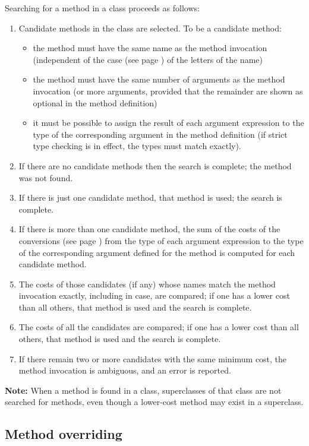 Searching for a method in a class proceeds as follows:
\begin{enumerate}
\item 
Candidate methods in the class are selected.
To be a candidate method:
\begin{itemize}
\item 
the method must have the same name as the method invocation (independent
of the  case (see page \pageref{refcase})  of the letters of the name)
\item 
the method must have the same number of arguments as the method
invocation (or more arguments, provided that the remainder are shown as
optional in the method definition)
\item 
it must be possible to assign the result of each argument expression to
the type of the corresponding argument in the method definition (if
strict type checking is in effect, the types must match exactly).
\end{itemize}
\item 
If there are no candidate methods then the search is complete; the
method was not found.
\item If there is just one candidate method, that method is used; the
search is complete.
\item 
If there is more than one candidate method, the sum of the
 costs of the conversions (see page \pageref{refcosts})  from the type of each
argument expression to the type of the corresponding argument defined
for the method is computed for each candidate method.
\item 
The costs of those candidates (if any) whose names match the method
invocation exactly, including in case, are compared; if one has a lower
cost than all others, that method is used and the search is complete.
\item 
The costs of all the candidates are compared; if one has a lower
cost than all others, that method is used and the search is complete.
\item 
If there remain two or more candidates with the same minimum cost, the
method invocation is ambiguous, and an error is reported.
\end{enumerate}
\textbf{Note: }When a method is found in a class, superclasses of that class are
not searched for methods, even though a lower-cost method may exist in a
superclass.
\subsection{Method overriding}\label{"id"}
 

